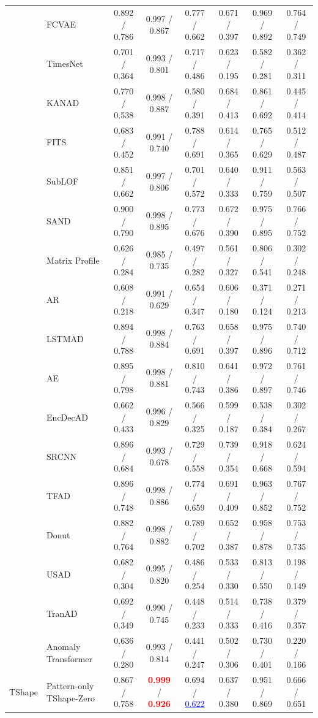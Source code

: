 \begin{table}[t]
{\begin{tabular}{@{}llcccccc@{}}
 & FCVAE & 0.892 / 0.786 & 0.997 / 0.867 & 0.777 / 0.662 & 0.671 / 0.397 & 0.969 / 0.892 & 0.764 / 0.749 \\
 & TimesNet & 0.701 / 0.364 & 0.993 / 0.801 & 0.717 / 0.486 & 0.623 / 0.195 & 0.582 / 0.281 & 0.362 / 0.311 \\
 & KANAD & 0.770 / 0.538 & 0.998 / 0.887 & 0.580 / 0.391 & 0.684 / 0.413 & 0.861 / 0.692 & 0.445 / 0.414 \\
 & FITS & 0.683 / 0.452 & 0.991 / 0.740 & 0.788 / 0.691 & 0.614 / 0.365 & 0.765 / 0.629 & 0.512 / 0.487 \\
 & SubLOF & 0.851 / 0.662 & 0.997 / 0.806 & 0.701 / 0.572 & 0.640 / 0.333 & 0.911 / 0.759 & 0.563 / 0.507 \\
 & SAND & 0.900 / 0.790 & 0.998 / 0.895 & 0.773 / 0.676 & 0.672 / 0.390 & 0.975 / 0.895 & 0.766 / 0.752 \\
 & Matrix Profile & 0.626 / 0.284 & 0.985 / 0.735 & 0.497 / 0.282 & 0.561 / 0.327 & 0.806 / 0.541 & 0.302 / 0.248 \\
 & AR & 0.608 / 0.218 & 0.991 / 0.629 & 0.654 / 0.347 & 0.606 / 0.180 & 0.371 / 0.124 & 0.271 / 0.213 \\
 & LSTMAD & 0.894 / 0.788 & 0.998 / 0.884 & 0.763 / 0.691 & 0.658 / 0.397 & 0.975 / 0.896 & 0.740 / 0.712 \\
 & AE & 0.895 / 0.798 & 0.998 / 0.881 & 0.810 / 0.743 & 0.641 / 0.386 & 0.972 / 0.897 & 0.761 / 0.746 \\
 & EncDecAD & 0.662 / 0.433 & 0.996 / 0.829 & 0.566 / 0.325 & 0.599 / 0.187 & 0.538 / 0.384 & 0.302 / 0.267 \\
 & SRCNN & 0.896 / 0.684 & 0.993 / 0.678 & 0.729 / 0.558 & 0.739 / 0.354 & 0.918 / 0.668 & 0.624 / 0.594 \\
 & TFAD & 0.896 / 0.748 & 0.998 / 0.886 & 0.774 / 0.659 & 0.691 / 0.409 & 0.963 / 0.852 & 0.767 / 0.752 \\
 & Donut & 0.882 / 0.764 & 0.998 / 0.882 & 0.789 / 0.702 & 0.652 / 0.387 & 0.958 / 0.878 & 0.753 / 0.735 \\
 & USAD & 0.682 / 0.304 & 0.995 / 0.820 & 0.486 / 0.254 & 0.533 / 0.330 & 0.813 / 0.550 & 0.198 / 0.149 \\
 & TranAD & 0.692 / 0.349 & 0.990 / 0.745 & 0.448 / 0.233 & 0.514 / 0.333 & 0.738 / 0.416 & 0.379 / 0.357 \\
 & Anomaly Transformer & 0.636 / 0.280 & 0.993 / 0.814 & 0.441 / 0.247 & 0.502 / 0.306 & 0.730 / 0.401 & 0.220 / 0.166 \\
\midrule
TShape & Pattern-only TShape-Zero & 0.867 / 0.758 & \textcolor{red}{\textbf{0.999}} / \textcolor{red}{\textbf{0.926}} & 0.694 / \textcolor{blue}{\underline{0.622}} & 0.637 / 0.380 & 0.951 / 0.869 & 0.666 / 0.651 \\

\end{tabular}}
\end{table}
